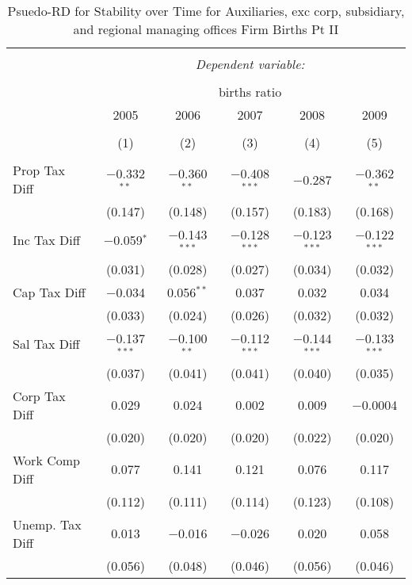 
\begin{table}[!htbp] \centering 
  \caption{Psuedo-RD for Stability over Time for  Auxiliaries, exc corp, subsidiary, and regional managing offices Firm Births Pt II} 
  \label{95year} 
\small 
\begin{tabular}{@{\extracolsep{5pt}}lccccc} 
\\[-1.8ex]\hline 
\hline \\[-1.8ex] 
 & \multicolumn{5}{c}{\textit{Dependent variable:}} \\ 
\cline{2-6} 
\\[-1.8ex] & \multicolumn{5}{c}{births ratio} \\ 
 & 2005 & 2006 & 2007 & 2008 & 2009 \\ 
\\[-1.8ex] & (1) & (2) & (3) & (4) & (5)\\ 
\hline \\[-1.8ex] 
 Prop Tax Diff & $-$0.332$^{**}$ & $-$0.360$^{**}$ & $-$0.408$^{***}$ & $-$0.287 & $-$0.362$^{**}$ \\ 
  & (0.147) & (0.148) & (0.157) & (0.183) & (0.168) \\ 
  Inc Tax Diff & $-$0.059$^{*}$ & $-$0.143$^{***}$ & $-$0.128$^{***}$ & $-$0.123$^{***}$ & $-$0.122$^{***}$ \\ 
  & (0.031) & (0.028) & (0.027) & (0.034) & (0.032) \\ 
  Cap Tax Diff & $-$0.034 & 0.056$^{**}$ & 0.037 & 0.032 & 0.034 \\ 
  & (0.033) & (0.024) & (0.026) & (0.032) & (0.032) \\ 
  Sal Tax Diff & $-$0.137$^{***}$ & $-$0.100$^{**}$ & $-$0.112$^{***}$ & $-$0.144$^{***}$ & $-$0.133$^{***}$ \\ 
  & (0.037) & (0.041) & (0.041) & (0.040) & (0.035) \\ 
  Corp Tax Diff & 0.029 & 0.024 & 0.002 & 0.009 & $-$0.0004 \\ 
  & (0.020) & (0.020) & (0.020) & (0.022) & (0.020) \\ 
  Work Comp Diff & 0.077 & 0.141 & 0.121 & 0.076 & 0.117 \\ 
  & (0.112) & (0.111) & (0.114) & (0.123) & (0.108) \\ 
  Unemp. Tax Diff & 0.013 & $-$0.016 & $-$0.026 & 0.020 & 0.058 \\ 
  & (0.056) & (0.048) & (0.046) & (0.056) & (0.046) \\ 

\end{tabular}
\end{table}
